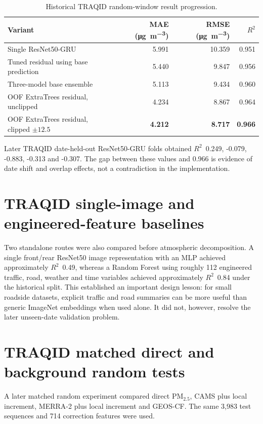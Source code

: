 \documentclass[11pt,a4paper,oneside]{report}
\newcommand{\pmtwo}{PM$_{2.5}$}
\newcommand{\ugm}{\si{\micro\gram\per\cubic\metre}}
\newcommand{\Rtwo}{$R^2$}
\begin{document}
\begin{table}[H]
  \centering
  \caption{Historical TRAQID random-window result progression.}
  \label{tab:traqidrandom}
  \begin{tabular}{lrrr}
    \toprule
    Variant & MAE (\ugm) & RMSE (\ugm) & \Rtwo\\
    \midrule
    Single ResNet50-GRU & 5.991 & 10.359 & 0.951\\
    Tuned residual using base prediction & 5.440 & 9.847 & 0.956\\
    Three-model base ensemble & 5.113 & 9.434 & 0.960\\
    OOF ExtraTrees residual, unclipped & 4.234 & 8.867 & 0.964\\
    OOF ExtraTrees residual, clipped $\pm12.5$ & \textbf{4.212} &
      \textbf{8.717} & \textbf{0.966}\\
    \bottomrule
  \end{tabular}
\end{table}

Later TRAQID date-held-out ResNet50-GRU folds obtained \Rtwo\ 0.249, -0.079,
-0.883, -0.313 and -0.307. The gap between these values and 0.966 is evidence
of date shift and overlap effects, not a contradiction in the implementation.

\section{TRAQID single-image and engineered-feature baselines}
Two standalone routes were also compared before atmospheric decomposition. A
single front/rear ResNet50 image representation with an MLP achieved
approximately \Rtwo\ 0.49, whereas a Random Forest using roughly 112
engineered traffic, road, weather and time variables achieved approximately
\Rtwo\ 0.84 under the historical split. This established an important design
lesson: for small roadside datasets, explicit traffic and road summaries can
be more useful than generic ImageNet embeddings when used alone. It did not,
however, resolve the later unseen-date validation problem.

\section{TRAQID matched direct and background random tests}
A later matched random experiment compared direct \pmtwo, CAMS plus local
increment, MERRA-2 plus local increment and GEOS-CF. The same 3,983 test
sequences and 714 correction features were used.
\end{document}
